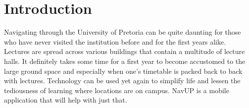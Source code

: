 \documentclass[11pt]{article}
\begin{document}
\section{Introduction}

Navigating through the University of Pretoria can be quite daunting for those who have never visited the institution before and for the first years alike. Lectures are spread across various buildings that contain a multitude of lecture halls. It definitely takes some time for a first year to become accustomed to the large ground space and especially when one’s timetable is packed back to back with lectures. Technology can be used yet again to simplify life and lessen the tediousness of learning where locations are on campus. NavUP is a mobile application that will help with just that.
\end{document}

